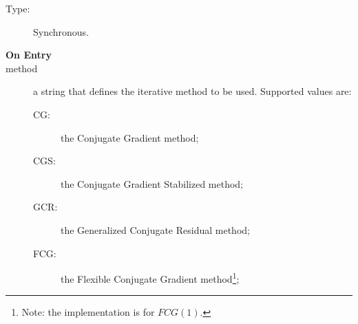 \begin{description}
\item[Type:] Synchronous.
\item[\bf On Entry]
\item[method] a string that defines the iterative method to be
  used. Supported values are:
  \begin{description}
  \item[CG:] the Conjugate Gradient method;
  \item[CGS:] the Conjugate Gradient Stabilized method;

  \item[GCR:] the Generalized Conjugate Residual method;
  \item[FCG:] the Flexible Conjugate Gradient method\footnote{Note:
      the implementation is for $FCG(1)$.};


\end{description}
\end{description}
